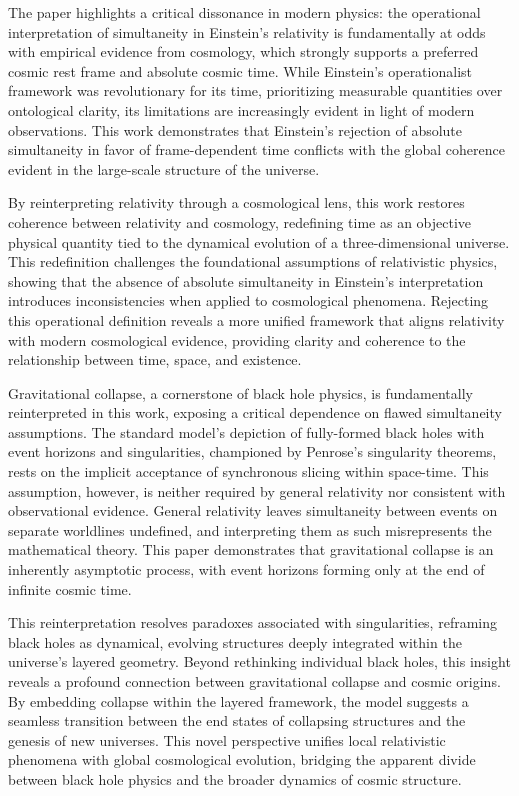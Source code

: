 \documentclass[aps,rmp,groupedaddress,twocolumn,10pt]{revtex4-2}
\begin{document}
The paper highlights a critical dissonance in modern physics: the operational interpretation of simultaneity in Einstein's relativity is fundamentally at odds with empirical evidence from cosmology, which strongly supports a preferred cosmic rest frame and absolute cosmic time. While Einstein's operationalist framework was revolutionary for its time, prioritizing measurable quantities over ontological clarity, its limitations are increasingly evident in light of modern observations. This work demonstrates that Einstein's rejection of absolute simultaneity in favor of frame-dependent time conflicts with the global coherence evident in the large-scale structure of the universe.

By reinterpreting relativity through a cosmological lens, this work restores coherence between relativity and cosmology, redefining time as an objective physical quantity tied to the dynamical evolution of a three-dimensional universe. This redefinition challenges the foundational assumptions of relativistic physics, showing that the absence of absolute simultaneity in Einstein's interpretation introduces inconsistencies when applied to cosmological phenomena. Rejecting this operational definition reveals a more unified framework that aligns relativity with modern cosmological evidence, providing clarity and coherence to the relationship between time, space, and existence.

Gravitational collapse, a cornerstone of black hole physics, is fundamentally reinterpreted in this work, exposing a critical dependence on flawed simultaneity assumptions. The standard model's depiction of fully-formed black holes with event horizons and singularities, championed by Penrose's singularity theorems, rests on the implicit acceptance of synchronous slicing within space-time. This assumption, however, is neither required by general relativity nor consistent with observational evidence. General relativity leaves simultaneity between events on separate worldlines undefined, and interpreting them as such misrepresents the mathematical theory. This paper demonstrates that gravitational collapse is an inherently asymptotic process, with event horizons forming only at the end of infinite cosmic time.

This reinterpretation resolves paradoxes associated with singularities, reframing black holes as dynamical, evolving structures deeply integrated within the universe's layered geometry. Beyond rethinking individual black holes, this insight reveals a profound connection between gravitational collapse and cosmic origins. By embedding collapse within the layered framework, the model suggests a seamless transition between the end states of collapsing structures and the genesis of new universes. This novel perspective unifies local relativistic phenomena with global cosmological evolution, bridging the apparent divide between black hole physics and the broader dynamics of cosmic structure.
\end{document}
